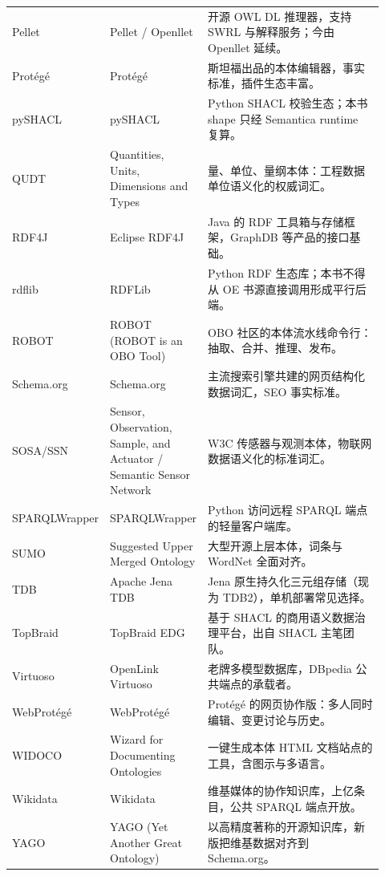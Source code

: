 \begin{longtable}{@{}p{0.16\linewidth}p{0.26\linewidth}p{0.5\linewidth}@{}}
Pellet & Pellet / Openllet & 开源 OWL DL 推理器，支持 SWRL 与解释服务；今由 Openllet 延续。 \\
Protégé & Protégé & 斯坦福出品的本体编辑器，事实标准，插件生态丰富。 \\
pySHACL & pySHACL & Python SHACL 校验生态；本书 shape 只经 Semantica runtime 复算。 \\
QUDT & Quantities, Units, Dimensions and Types & 量、单位、量纲本体：工程数据单位语义化的权威词汇。 \\
RDF4J & Eclipse RDF4J & Java 的 RDF 工具箱与存储框架，GraphDB 等产品的接口基础。 \\
rdflib & RDFLib & Python RDF 生态库；本书不得从 OE 书源直接调用形成平行后端。 \\
ROBOT & ROBOT (ROBOT is an OBO Tool) & OBO 社区的本体流水线命令行：抽取、合并、推理、发布。 \\
Schema.org & Schema.org & 主流搜索引擎共建的网页结构化数据词汇，SEO 事实标准。 \\
SOSA/SSN & Sensor, Observation, Sample, and Actuator / Semantic Sensor Network & W3C 传感器与观测本体，物联网数据语义化的标准词汇。 \\
SPARQL\allowbreak Wrapper & SPARQL\allowbreak Wrapper & Python 访问远程 SPARQL 端点的轻量客户端库。 \\
SUMO & Suggested Upper Merged Ontology & 大型开源上层本体，词条与 WordNet 全面对齐。 \\
TDB & Apache Jena TDB & Jena 原生持久化三元组存储（现为 TDB2），单机部署常见选择。 \\
TopBraid & TopBraid EDG & 基于 SHACL 的商用语义数据治理平台，出自 SHACL 主笔团队。 \\
Virtuoso & OpenLink Virtuoso & 老牌多模型数据库，DBpedia 公共端点的承载者。 \\
WebProtégé & WebProtégé & Protégé 的网页协作版：多人同时编辑、变更讨论与历史。 \\
WIDOCO & Wizard for Documenting Ontologies & 一键生成本体 HTML 文档站点的工具，含图示与多语言。 \\
Wikidata & Wikidata & 维基媒体的协作知识库，上亿条目，公共 SPARQL 端点开放。 \\
YAGO & YAGO (Yet Another Great Ontology) & 以高精度著称的开源知识库，新版把维基数据对齐到 Schema.org。 \\
\end{longtable}
